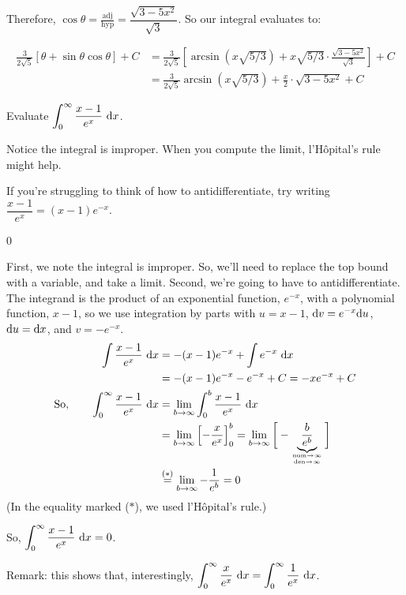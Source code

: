 \begin{solution}
\begin{center}
\end{center}

Therefore, $\cos\theta = \frac{\mbox{adj}}{\mbox{hyp}} = \dfrac{\sqrt{3-5x^2}}{\sqrt{3}}$. So our integral evaluates to:

\begin{align*}
\frac{3}{2\sqrt{5}}\left[
\theta + \sin\theta\cos\theta
\right]+C&=
\frac{3}{2\sqrt{5}}\left[
\arcsin(x\sqrt{5/3}) + x\sqrt{5/3}\cdot \frac{\sqrt{3-5x^2}}{\sqrt{3}}
\right]+C\\
&=
\frac{3}{2\sqrt{5}}
\arcsin(x\sqrt{5/3}) + \frac{x}{2}\cdot {\sqrt{3-5x^2}}
+C
\end{align*}
\end{solution}

\begin{question}
Evaluate $\displaystyle\int_0^\infty \dfrac{x-1}{e^x}~\mathrm{d}x$.
\end{question}
\begin{hint}
Notice the integral is improper. When you compute the limit, l'H\^{o}pital's rule might help.

If you're struggling to think of how to antidifferentiate, try writing $\dfrac{x-1}{e^x} = (x-1)e^{-x}$.
\end{hint}
\begin{answer}
0
\end{answer}
\begin{solution}
First, we note the integral is improper. So, we'll need to replace the top bound with a variable, and take a limit. Second, we're going to have to antidifferentiate. The integrand is the product of an exponential function, $e^{-x}$, with a polynomial function, $x-1$, so we use integration by parts with $u=x-1$, $\mathrm{d}v=e^{-x}\mathrm{d}u$, $\mathrm{d}u=\mathrm{d}x$, and $v = -e^{-x}$.
\begin{align*}
\int \dfrac{x-1}{e^x}~\dee{x}&=-(x-1)e^{-x} + \int e^{-x}~\dee{x}
\\&=-(x-1)e^{-x} -e^{-x}+C
=-xe^{-x}+C\\
\text{So,}\qquad\int_0^\infty \dfrac{x-1}{e^x}~\dee{x} & = \lim_{b \to \infty}\int_0^b \dfrac{x-1}{e^x}~\dee{x}\\
& = \lim_{b \to \infty}\left[-\frac{x}{e^x}\right]_0^b = \lim_{b \to \infty}\bigg[-\underbrace{\frac{b}{e^b}}_{\atp{\mathrm{num}\to\infty}{\mathrm{den}\to\infty}}\bigg]\\
& \stackrel{(*)}{=} \lim_{b \to \infty}-\frac{1}{e^b}=0
\end{align*}
(In the equality marked ($*$), we used l'H\^{o}pital's rule.)

So, $\displaystyle\int_0^\infty \dfrac{x-1}{e^x}~\mathrm{d}x=0$.

Remark: this shows that, interestingly, $\displaystyle\int_0^\infty \dfrac{x}{e^x}~\mathrm{d}x=\displaystyle\int_0^\infty \dfrac{1}{e^x}~\mathrm{d}x$.
\end{solution}



